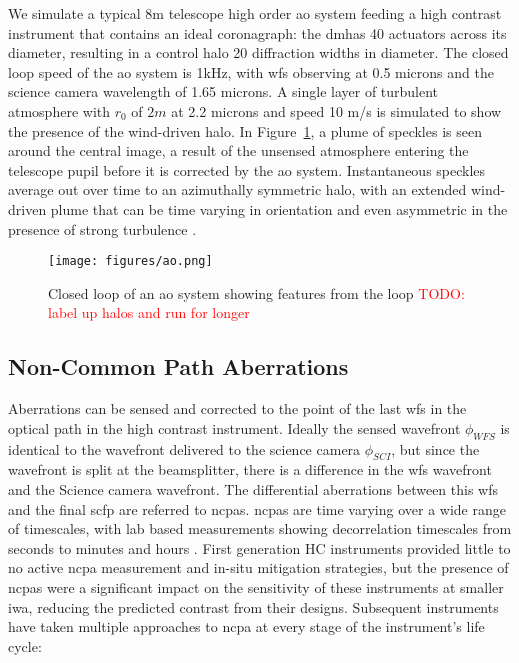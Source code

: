 \documentclass[letterpaper]{ar-1col}
\begin{document}
We simulate a typical 8m telescope high order \ac{ao} system feeding a high contrast instrument that contains an ideal coronagraph: the \ac{dm}has 40 actuators across its diameter, resulting in a control halo 20 diffraction widths in diameter. 
%
The closed loop speed of the \ac{ao} system is 1kHz, with \ac{wfs} observing at 0.5 microns and the science camera wavelength of 1.65 microns.
%
A single layer of turbulent atmosphere with $r_0$ of $2m$ at 2.2 microns and speed 10 m/s is simulated to show the presence of the wind-driven halo.
%
In Figure~\ref{fig:ao}, a plume of speckles is seen around the central image, a result of the unsensed atmosphere entering the telescope pupil before it is corrected by the \ac{ao} system. 
%
Instantaneous speckles average out over time to an azimuthally symmetric halo, with an extended wind-driven plume that can be time varying in orientation and even asymmetric in the presence of strong turbulence \citep{Cantalloube18}.


\begin{figure}[ht]
  \centering
  \texttt{[image: figures/ao.png]}
  \caption{Closed loop of an \ac{ao} system showing features from the loop \textcolor{red}{TODO: label up halos and run for longer}}
  \label{fig:ao}
\end{figure}

\subsection{Non-Common Path Aberrations}

Aberrations can be sensed and corrected to the point of the last \ac{wfs} in the optical path in the high contrast instrument.
%
Ideally the sensed wavefront $\phi_{WFS}$ is identical to the wavefront delivered to the science camera $\phi_{SCI}$, but since the wavefront is split at the beamsplitter, there is a difference in the \ac{wfs} wavefront and the Science camera wavefront.
%
The differential aberrations between this \ac{wfs} and the final \ac{scfp} are referred to \acp{ncpa}.
%
\acp{ncpa} are time varying over a wide range of timescales, with lab based measurements showing decorrelation timescales from seconds to minutes and hours \citep{Martinez12,Males21}.
%
First generation HC instruments provided little to no active \ac{ncpa} measurement and in-situ mitigation strategies, but the presence of \acp{ncpa} were a significant impact on the sensitivity of these instruments at smaller \ac{iwa}, reducing the predicted contrast from their designs.
%
Subsequent instruments have taken multiple approaches to \ac{ncpa} at every stage of the instrument's life cycle:
\end{document}
